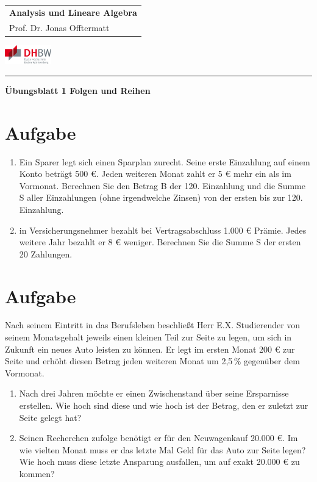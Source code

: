 \documentclass[fontsize=11pt, parskip=half]{scrartcl}
\begin{document}
\noindent
\begin{tabular}{l}
    \textbf{Analysis und Lineare Algebra} \\    
    Prof. Dr. Jonas Offtermatt
\end{tabular}
\hfill \includegraphics[width=2cm]{DHBW.pdf}\\
\rule{\textwidth}{0.5pt}


\begin{center}
    \Large
    \textbf{Übungsblatt 1 Folgen und Reihen}
\end{center}

\section{Aufgabe}
\begin{enumerate}[label=\alph*)]
    \item Ein Sparer legt sich einen Sparplan zurecht. Seine erste Einzahlung auf
    einem Konto beträgt 500 €. Jeden weiteren Monat zahlt er 5 € mehr
    ein als im Vormonat. Berechnen Sie den Betrag B der 120. Einzahlung
    und die Summe S aller Einzahlungen (ohne irgendwelche Zinsen) von
    der ersten bis zur 120. Einzahlung.
    \item in Versicherungsnehmer bezahlt bei Vertragsabschluss 1.000 € Prämie.
    Jedes weitere Jahr bezahlt er 8 € weniger. Berechnen Sie die Summe
    S der ersten 20 Zahlungen.
\end{enumerate}


\section{Aufgabe}
Nach seinem Eintritt in das Berufsleben beschließt Herr
E.X. Studierender von seinem Monatsgehalt jeweils einen kleinen Teil
zur Seite zu legen, um sich in Zukunft ein neues Auto leisten zu
können. Er legt im ersten Monat 200 € zur Seite
und erhöht diesen Betrag jeden weiteren Monat um 2,5\,$\%$ gegenüber dem Vormonat.\\[-0.7cm]

\begin{enumerate}
\item Nach drei Jahren möchte er einen Zwischenstand über seine
Ersparnisse erstellen. Wie hoch sind diese und wie hoch ist der
Betrag, den er zuletzt zur Seite gelegt hat?\\[-0.7cm]
\item Seinen Recherchen zufolge benötigt er für den Neuwagenkauf 20.000 €. Im wie vielten Monat
muss er das letzte Mal Geld für das Auto zur Seite legen? Wie hoch muss diese letzte Ansparung ausfallen, um auf exakt 20.000 € zu kommen?\\[-0.7cm]
\end{enumerate}
\end{document}
